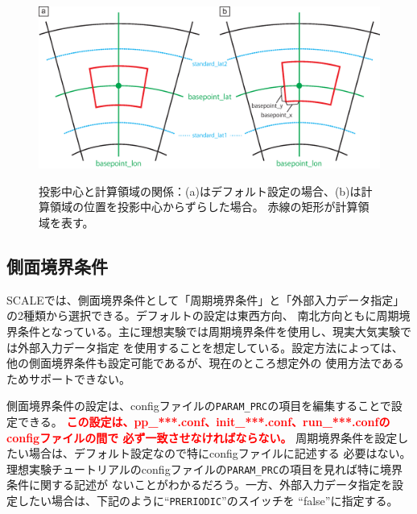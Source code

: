 \begin{figure}[t]
\begin{center}
  \includegraphics[width=0.8\hsize]{./figure/LC_latlon_xy.eps}\\
  \caption{投影中心と計算領域の関係：(a)はデフォルト設定の場合、(b)は計算領域の位置を投影中心からずらした場合。
  赤線の矩形が計算領域を表す。}
  \label{fig:map_lc}
\end{center}
\end{figure}


\subsection{側面境界条件} \label{sec:adv_lateralbnd}
SCALEでは、側面境界条件として「周期境界条件」と「外部入力データ指定」の2種類から選択できる。デフォルトの設定は東西方向、
南北方向ともに周期境界条件となっている。主に理想実験では周期境界条件を使用し、現実大気実験では外部入力データ指定
を使用することを想定している。設定方法によっては、他の側面境界条件も設定可能であるが、現在のところ想定外の
使用方法であるためサポートできない。

側面境界条件の設定は、configファイルの\verb|PARAM_PRC|の項目を編集することで設定できる。
\textcolor{red}{\bf この設定は、pp\_***.conf、init\_***.conf、run\_***.confのconfigファイルの間で
必ず一致させなければならない。} 周期境界条件を設定したい場合は、デフォルト設定なので特にconfigファイルに記述する
必要はない。理想実験チュートリアルのconfigファイルの\verb|PARAM_PRC|の項目を見れば特に境界条件に関する記述が
ないことがわかるだろう。一方、外部入力データ指定を設定したい場合は、下記のように``\verb|PRERIODIC|''のスイッチを
``false''に指定する。\\

{\small {\gt
{}}}\\

